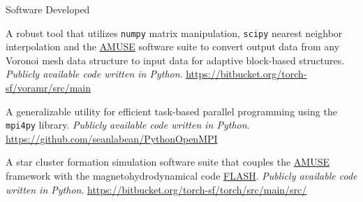 \documentclass{resume} %
\begin{document}
\begin{rSection}{Software Developed}

\underline{}

\begin{description}[leftmargin=10em, style=nextline]

\item[\texttt{VorAMR}] A robust tool that utilizes \texttt{numpy} matrix manipulation, \texttt{scipy} nearest neighbor interpolation and the \href{https://www.amusecode.org/}{AMUSE} software suite to convert output data from any Voronoi mesh data structure to input data for adaptive block-based structures.  \textit{Publicly available code written in Python}. \href{https://bitbucket.org/torch-sf/vor-amr/src/main/}{https://bitbucket.org/torch-sf/voramr/src/main}

\item[\texttt{PythonOpenMPI}] A generalizable utility for efficient task-based parallel programming using the \texttt{mpi4py} library. \textit{Publicly available code written in Python}.\\ \href{https://github.com/seanlabean/PythonOpenMPI}{https://github.com/seanlabean/PythonOpenMPI}

\end{description}

\underline{}

\begin{description}[leftmargin=10em, style=nextline]

\item[\texttt{Torch}] A star cluster formation simulation software suite that couples the \href{https://www.amusecode.org/}{AMUSE} framework with the magnetohydrodynamical code  \href{https://flash.rochester.edu/site/flashcode/user_support/}{FLASH}.  \textit{Publicly available code written in Python}. \href{https://bitbucket.org/torch-sf/torch/src/main/src/}{https://bitbucket.org/torch-sf/torch/src/main/src/}

\end{description}

\end{rSection}


\end{document}
